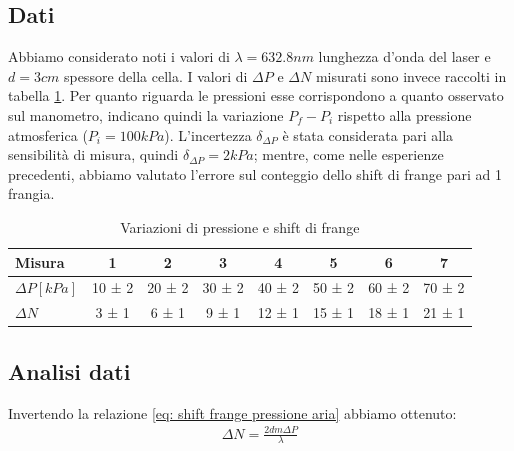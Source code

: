 \documentclass[a4paper]{article}
\begin{document}
\subsection{Dati}
Abbiamo considerato noti i valori di $\lambda=632.8 nm$ lunghezza d'onda del laser e $d=3 cm$ spessore della cella. I valori di $\Delta P$ e $\Delta N$ misurati sono invece raccolti in tabella \ref{tab: delta p e delta n}. Per quanto riguarda le pressioni esse corrispondono a quanto osservato sul manometro, indicano quindi la variazione $P_f- P_i$ rispetto alla pressione atmosferica ($P_i = 100 kPa$). L'incertezza $\delta_{\Delta P}$ è stata considerata pari alla sensibilità di misura, quindi $\delta_{\Delta P}=2 kPa$; mentre, come nelle esperienze precedenti, abbiamo valutato l'errore sul conteggio dello shift di frange pari ad 1 frangia.

\begin{table}[htbp]
\centering
\caption{Variazioni di pressione e shift di frange}
\label{tab: delta p e delta n}
\begin{tabular}{|l|ccccccc|}
\hline
Misura & 1 & 2 & 3 & 4 & 5 & 6 & 7 \\\hline\hline
$\Delta P [kPa]$ & 10 ± 2 & 20 ± 2 & 30 ± 2 & 40 ± 2 & 50 ± 2 & 60 ± 2 & 70 ± 2 \\\hline
$\Delta N$ & 3 ± 1 & 6 ± 1 & 9 ± 1 & 12 ± 1 & 15 ± 1 & 18 ± 1 & 21 ± 1 \\\hline
\end{tabular}
\end{table}

\subsection{Analisi dati}
Invertendo la relazione \ref{eq: shift frange pressione aria} abbiamo ottenuto:
\begin{align}
    \Delta N = \frac{2dm \Delta P}{\lambda}
\end{align}
\end{document}

